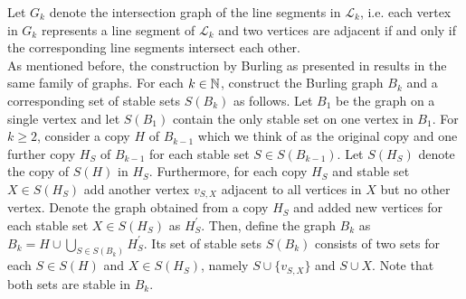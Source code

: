 Let $G_k$ denote the intersection graph of the line segments in $\mathcal{L}_k$, i.e. each vertex in $G_k$ represents a line segment of $\mathcal{L}_k$ and two vertices are adjacent if and only if the corresponding line segments intersect each other.\\

As mentioned before, the construction by Burling as presented in \cite{Fe18} results in the same family of graphs. For each $k\in\mathbb{N}$, construct the Burling graph $B_k$ and a corresponding set of stable sets $S(B_k)$ as follows. Let $B_1$ be the graph on a single vertex and let $S(B_1)$ contain the only stable set on one vertex in $B_1$. For $k\geq 2$, consider a copy $H$ of $B_{k-1}$ which we think of as the original copy and one further copy $H_S$ of $B_{k-1}$ for each stable set $S\in S(B_{k-1})$. Let $S(H_S)$ denote the copy of $S(H)$ in $H_S$. Furthermore, for each copy $H_S$ and stable set $X\in S(H_S)$ add another vertex $v_{S,X}$ adjacent to all vertices in $X$ but no other vertex. Denote the graph obtained from a copy $H_S$ and added new vertices for each stable set $X\in S(H_S)$ as $H_S^{\prime}$. Then, define the graph $B_k$ as $B_k=H\cup\bigcup_{S\in S(B_k)} H_S^{\prime}$. Its set of stable sets $S(B_k)$ consists of two sets for each $S\in S(H)$ and $X\in S(H_S)$, namely $S\cup \lbrace v_{S,X}\rbrace$ and $S\cup X$. Note that both sets are stable in $B_k$.


